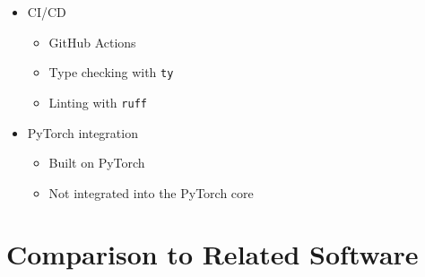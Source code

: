 \documentclass[twoside,11pt]{article}
\begin{document}
{\begin{itemize}
\begin{itemize}
    \end{itemize}
    \item CI/CD
    \begin{itemize}
        \item GitHub Actions
        \item Type checking with \texttt{ty}
        \item Linting with \texttt{ruff}
    \end{itemize}
    \item PyTorch integration
    \begin{itemize}
        \item Built on PyTorch
        \item Not integrated into the PyTorch core
    \end{itemize}
\end{itemize}
}

\section{Comparison to Related Software}
\label{sec:comparison}
\end{document}
